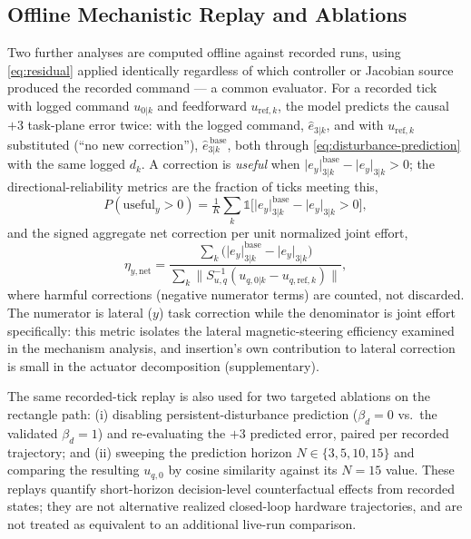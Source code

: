\documentclass[journal]{IEEEtran}
\begin{document}
\subsection{Offline Mechanistic Replay and Ablations}
\label{sec:replay}

Two further analyses are computed offline against recorded runs, using
\eqref{eq:residual} applied identically regardless of which controller or
Jacobian source produced the recorded command --- a common evaluator. For
a recorded tick with logged command $u_{0|k}$ and feedforward
$u_{\mathrm{ref},k}$, the model predicts the causal $+3$ task-plane error
twice: with the logged command, $\hat e_{3|k}$, and with
$u_{\mathrm{ref},k}$ substituted (``no new correction''),
$\hat e_{3|k}^{\,\mathrm{base}}$, both through
\eqref{eq:disturbance-prediction} with the same logged $d_k$. A correction
is \emph{useful} when
$\lvert e_y\rvert^{\mathrm{base}}_{3|k}-\lvert e_y\rvert_{3|k}>0$; the
directional-reliability metrics are the fraction of ticks meeting this,
\begin{equation}
P(\text{useful}_y{>}0) =
\tfrac1K\textstyle\sum_k \mathbb{1}\big[\lvert e_y\rvert^{\mathrm{base}}_{3|k}
-\lvert e_y\rvert_{3|k}>0\big],
\label{eq:p-useful}
\end{equation}
and the signed aggregate net correction per unit normalized joint effort,
\begin{equation}
\eta_{y,\mathrm{net}} =
\frac{\sum_k\big(\lvert e_y\rvert^{\mathrm{base}}_{3|k}-\lvert e_y\rvert_{3|k}\big)}
{\sum_k\big\lVert S_{u,q}^{-1}(u_{q,0|k}-u_{q,\mathrm{ref},k})\big\rVert},
\label{eq:eta-y}
\end{equation}
where harmful corrections (negative numerator terms) are counted, not
discarded. The numerator is lateral ($y$) task correction while the
denominator is joint effort specifically: this metric isolates the
lateral magnetic-steering efficiency examined in the mechanism analysis,
and insertion's own contribution to lateral correction is small in the
actuator decomposition (supplementary).

The same recorded-tick replay is also used for two targeted ablations on
the rectangle path: (i) disabling persistent-disturbance prediction
($\beta_d=0$ vs.\ the validated $\beta_d=1$) and re-evaluating the $+3$
predicted error, paired per recorded trajectory; and (ii) sweeping the
prediction horizon $N\in\{3,5,10,15\}$ and comparing the resulting
$u_{q,0}$ by cosine similarity against its $N{=}15$ value. These replays
quantify short-horizon decision-level counterfactual effects from
recorded states; they are not alternative realized closed-loop hardware
trajectories, and are not treated as equivalent to an additional live-run
comparison.
\end{document}

